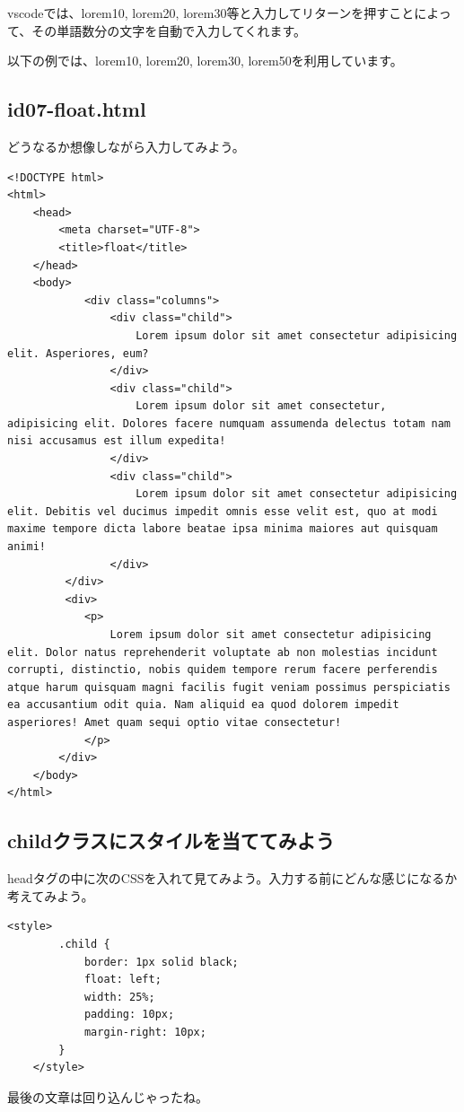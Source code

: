\documentclass[mingoth,11pt,a4j,uplatex,dvipdfmx]{jsarticle}
\begin{document}
vscodeでは、lorem10, lorem20, lorem30等と入力してリターンを押すことによって、その単語数分の文字を自動で入力してくれます。

以下の例では、lorem10, lorem20, lorem30, lorem50を利用しています。



\subsection{id07-float.html}
どうなるか想像しながら入力してみよう。
\begin{lstlisting}[caption=HTML部分]
<!DOCTYPE html>
<html>
	<head>
		<meta charset="UTF-8">
		<title>float</title>
	</head>
	<body>
    		<div class="columns">
		        <div class="child">
		            Lorem ipsum dolor sit amet consectetur adipisicing elit. Asperiores, eum?
		        </div>
		        <div class="child">
		            Lorem ipsum dolor sit amet consectetur, adipisicing elit. Dolores facere numquam assumenda delectus totam nam nisi accusamus est illum expedita!
		        </div>
		        <div class="child">
		            Lorem ipsum dolor sit amet consectetur adipisicing elit. Debitis vel ducimus impedit omnis esse velit est, quo at modi maxime tempore dicta labore beatae ipsa minima maiores aut quisquam animi!
		        </div>
		 </div>
		 <div>
			<p>
				Lorem ipsum dolor sit amet consectetur adipisicing elit. Dolor natus reprehenderit voluptate ab non molestias incidunt corrupti, distinctio, nobis quidem tempore rerum facere perferendis atque harum quisquam magni facilis fugit veniam possimus perspiciatis ea accusantium odit quia. Nam aliquid ea quod dolorem impedit asperiores! Amet quam sequi optio vitae consectetur!
			</p>
		</div>
	</body>
</html>
\end{lstlisting}


\subsection{childクラスにスタイルを当ててみよう}
headタグの中に次のCSSを入れて見てみよう。入力する前にどんな感じになるか考えてみよう。
\begin{lstlisting}[caption=CSS部分1]
    <style>
        .child {
            border: 1px solid black;
            float: left;
            width: 25%;
            padding: 10px;
            margin-right: 10px;
        }
    </style>

\end{lstlisting}
最後の文章は回り込んじゃったね。
\end{document}
